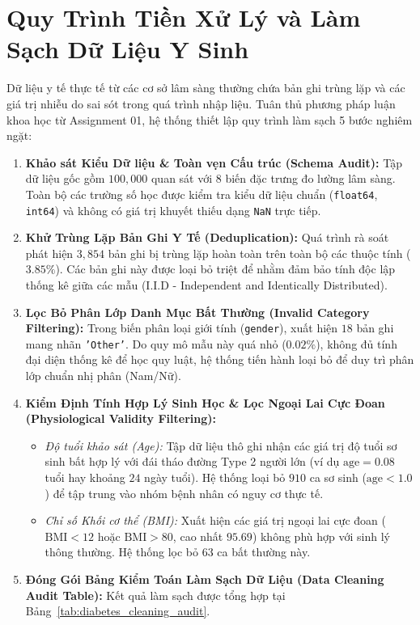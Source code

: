 \documentclass[12pt,a4paper]{report}
\begin{document}
\section{Quy Trình Tiền Xử Lý và Làm Sạch Dữ Liệu Y Sinh}
Dữ liệu y tế thực tế từ các cơ sở lâm sàng thường chứa bản ghi trùng lặp và các giá trị nhiễu do sai sót trong quá trình nhập liệu. Tuân thủ phương pháp luận khoa học từ Assignment 01, hệ thống thiết lập quy trình làm sạch 5 bước nghiêm ngặt:

\begin{enumerate}[leftmargin=2em]
    \item \textbf{Khảo sát Kiểu Dữ liệu \& Toàn vẹn Cấu trúc (Schema Audit):} Tập dữ liệu gốc gồm $100,000$ quan sát với 8 biến đặc trưng đo lường lâm sàng. Toàn bộ các trường số học được kiểm tra kiểu dữ liệu chuẩn (\texttt{float64}, \texttt{int64}) và không có giá trị khuyết thiếu dạng \texttt{NaN} trực tiếp.
    \item \textbf{Khử Trùng Lặp Bản Ghi Y Tế (Deduplication):} Quá trình rà soát phát hiện $3,854$ bản ghi bị trùng lặp hoàn toàn trên toàn bộ các thuộc tính ($3.85\%$). Các bản ghi này được loại bỏ triệt để nhằm đảm bảo tính độc lập thống kê giữa các mẫu (I.I.D - Independent and Identically Distributed).
    \item \textbf{Lọc Bỏ Phân Lớp Danh Mục Bất Thường (Invalid Category Filtering):} Trong biến phân loại giới tính (\texttt{gender}), xuất hiện $18$ bản ghi mang nhãn \texttt{'Other'}. Do quy mô mẫu này quá nhỏ ($0.02\%$), không đủ tính đại diện thống kê để học quy luật, hệ thống tiến hành loại bỏ để duy trì phân lớp chuẩn nhị phân (Nam/Nữ).
    \item \textbf{Kiểm Định Tính Hợp Lý Sinh Học \& Lọc Ngoại Lai Cực Đoan (Physiological Validity Filtering):}
    \begin{itemize}
        \item \textit{Độ tuổi khảo sát (Age):} Tập dữ liệu thô ghi nhận các giá trị độ tuổi sơ sinh bất hợp lý với đái tháo đường Type 2 người lớn (ví dụ $\text{age} = 0.08$ tuổi hay khoảng $24$ ngày tuổi). Hệ thống loại bỏ $910$ ca sơ sinh ($\text{age} < 1.0$) để tập trung vào nhóm bệnh nhân có nguy cơ thực tế.
        \item \textit{Chỉ số Khối cơ thể (BMI):} Xuất hiện các giá trị ngoại lai cực đoan ($\text{BMI} < 12$ hoặc $\text{BMI} > 80$, cao nhất $95.69$) không phù hợp với sinh lý thông thường. Hệ thống lọc bỏ $63$ ca bất thường này.
    \end{itemize}
    \item \textbf{Đóng Gói Bảng Kiểm Toán Làm Sạch Dữ Liệu (Data Cleaning Audit Table):} Kết quả làm sạch được tổng hợp tại Bảng~\ref{tab:diabetes_cleaning_audit}.
\end{enumerate}
\end{document}
